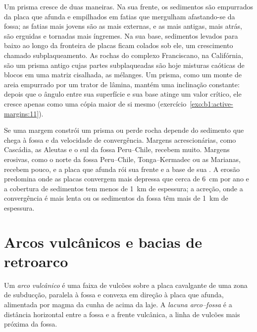Um prisma cresce de duas maneiras. Na sua frente, os sedimentos são empurrados da placa que afunda e empilhados em fatias que mergulham afastando-se da fossa; as fatias mais jovens são as mais externas, e as mais antigas, mais atrás, são erguidas e tornadas mais íngremes. Na sua base, sedimentos levados para baixo ao longo da fronteira de placas ficam colados sob ele, um crescimento chamado subplaqueamento. As rochas do complexo Franciscano, na Califórnia, são um prisma antigo cujas partes subplaqueadas são hoje misturas caóticas de blocos em uma matriz cisalhada, as mélanges. Um prisma, como um monte de areia empurrado por um trator de lâmina, mantém uma inclinação constante: depois que o ângulo entre sua superfície e sua base atinge um valor crítico, ele cresce apenas como uma cópia maior de si mesmo (exercício~\ref{exo:b1:active-margins:11}).

Se uma margem constrói um prisma ou perde rocha depende do sedimento que chega à fossa e da velocidade de convergência. Margens acrescionárias, como Cascádia, as Aleutas e o sul da fossa Peru--Chile, recebem muito. Margens erosivas, como o norte da fossa Peru--Chile, Tonga--Kermadec ou as Marianas, recebem pouco, e a placa que afunda rói sua frente e a base de sua . A erosão predomina onde as placas convergem mais depressa que cerca de \qty{6}{cm} por ano e a cobertura de sedimentos tem menos de \qty{1}{km} de espessura; a acreção, onde a convergência é mais lenta ou os sedimentos da fossa têm mais de \qty{1}{km} de espessura.

\section{Arcos vulcânicos e bacias de retroarco}\label{sec:b1:active-margins:arcs}

\begin{definition}\label{def:b1:active-margins:volcanic-arc}
Um \emph{arco vulcânico} é uma faixa de vulcões sobre a placa cavalgante de uma zona de subducção, paralela à fossa e convexa em direção à placa que afunda, alimentada por magma da cunha de  acima da laje. A \emph{lacuna arco--fossa} é a distância horizontal entre a fossa e a frente vulcânica, a linha de vulcões mais próxima da fossa.
\end{definition}

